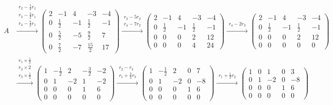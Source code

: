 \documentclass[a4paper]{report}
\begin{document}
\begin{jie}
\begin{align*}
A&\xrightarrow{\substack{r_2-\frac{1}{2}r_1\\ r_3-\frac{3}{2}r_1\\ r_4-\frac{7}{2}r_1}}
{
\begin{pmatrix}
2 &-1&4&-3&-4\\ 0&\frac{1}{2}&-1&\frac{1}{2}&-1\\ 0&\frac{5}{2}&-5&\frac{9}{2}&7\\ 0&\frac{7}{2}&-7&\frac{15}{2}&17
\end{pmatrix}
}\xrightarrow{\substack{r_3-5r_2\\ r_4-7r_2}}
{
\begin{pmatrix}
2 &-1&4&-3&-4\\ 0&\frac{1}{2}&-1&\frac{1}{2}&-1\\ 0&0&0&2&12\\ 0&0&0&4&24
\end{pmatrix}
}\xrightarrow{\substack{r_4-2r_3}}
{
\begin{pmatrix}
2 &-1&4&-3&-4\\ 0&\frac{1}{2}&-1&\frac{1}{2}&-1\\ 0&0&0&2&12\\ 0&0&0&0&0
\end{pmatrix}
}\\ &\xrightarrow{\substack{r_1\times \frac{1}{2}\\ r_2\times 2\\ r_{3}\times\frac{1}{2}}}
{
\begin{pmatrix}
1 &-\frac{1}{2}&2&-\frac{3}{2}&-2\\ 0&1&-2&1&-2\\ 0&0&0&1&6\\ 0&0&0&0&0
\end{pmatrix}
}\xrightarrow{\substack{r_2-r_{3}\\ r_1+\frac{3}{2}r_{3}}}
{
\begin{pmatrix}
1 &-\frac{1}{2}&2&0&7\\ 0&1&-2&0&-8\\ 0&0&0&1&6\\ 0&0&0&0&0
\end{pmatrix}
}\xrightarrow{\substack{r_1+\frac{1}{2}r_{2}}}
{
\begin{pmatrix}
1 &0&1&0&3\\ 0&1&-2&0&-8\\ 0&0&0&1&6\\ 0&0&0&0&0
\end{pmatrix}
}
\end{align*}
\end{jie}
\end{document}
